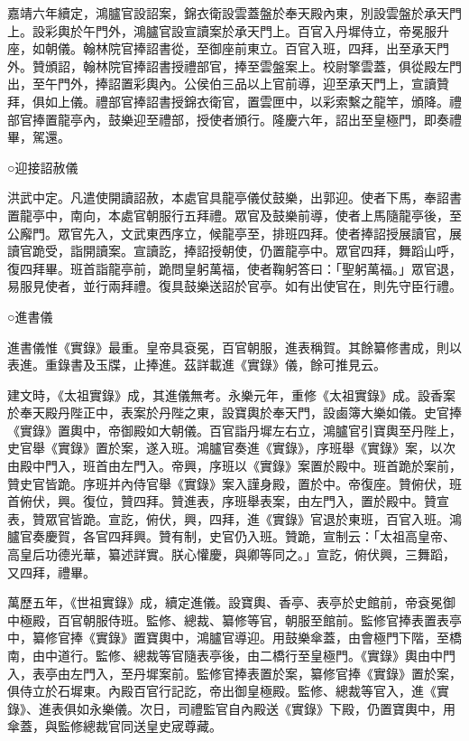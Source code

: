 嘉靖六年續定，鴻臚官設詔案，錦衣衛設雲蓋盤於奉天殿內東，別設雲盤於承天門上。設彩輿於午門外，鴻臚官設宣讀案於承天門上。百官入丹墀侍立，帝冕服升座，如朝儀。翰林院官捧詔書從，至御座前東立。百官入班，四拜，出至承天門外。贊頒詔，翰林院官捧詔書授禮部官，捧至雲盤案上。校尉擎雲蓋，俱從殿左門出，至午門外，捧詔置彩輿內。公侯伯三品以上官前導，迎至承天門上，宣讀贊拜，俱如上儀。禮部官捧詔書授錦衣衛官，置雲匣中，以彩索繫之龍竿，頒降。禮部官捧置龍亭內，鼓樂迎至禮部，授使者頒行。隆慶六年，詔出至皇極門，即奏禮畢，駕還。

○迎接詔赦儀

洪武中定。凡遣使開讀詔赦，本處官具龍亭儀仗鼓樂，出郭迎。使者下馬，奉詔書置龍亭中，南向，本處官朝服行五拜禮。眾官及鼓樂前導，使者上馬隨龍亭後，至公廨門。眾官先入，文武東西序立，候龍亭至，排班四拜。使者捧詔授展讀官，展讀官跪受，詣開讀案。宣讀訖，捧詔授朝使，仍置龍亭中。眾官四拜，舞蹈山呼，復四拜畢。班首詣龍亭前，跪問皇躬萬福，使者鞠躬答曰：「聖躬萬福。」眾官退，易服見使者，並行兩拜禮。復具鼓樂送詔於官亭。如有出使官在，則先守臣行禮。

○進書儀

進書儀惟《實錄》最重。皇帝具袞冕，百官朝服，進表稱賀。其餘纂修書成，則以表進。重錄書及玉牒，止捧進。茲詳載進《實錄》儀，餘可推見云。

建文時，《太祖實錄》成，其進儀無考。永樂元年，重修《太祖實錄》成。設香案於奉天殿丹陛正中，表案於丹陛之東，設寶輿於奉天門，設鹵簿大樂如儀。史官捧《實錄》置輿中，帝御殿如大朝儀。百官詣丹墀左右立，鴻臚官引寶輿至丹陛上，史官舉《實錄》置於案，遂入班。鴻臚官奏進《實錄》，序班舉《實錄》案，以次由殿中門入，班首由左門入。帝興，序班以《實錄》案置於殿中。班首跪於案前，贊史官皆跪。序班并內侍官舉《實錄》案入謹身殿，置於中。帝復座。贊俯伏，班首俯伏，興。復位，贊四拜。贊進表，序班舉表案，由左門入，置於殿中。贊宣表，贊眾官皆跪。宣訖，俯伏，興，四拜，進《實錄》官退於東班，百官入班。鴻臚官奏慶賀，各官四拜興。贊有制，史官仍入班。贊跪，宣制云：「太祖高皇帝、高皇后功德光華，纂述詳實。朕心懽慶，與卿等同之。」宣訖，俯伏興，三舞蹈，又四拜，禮畢。

萬歷五年，《世祖實錄》成，續定進儀。設寶輿、香亭、表亭於史館前，帝袞冕御中極殿，百官朝服侍班。監修、總裁、纂修等官，朝服至館前。監修官捧表置表亭中，纂修官捧《實錄》置寶輿中，鴻臚官導迎。用鼓樂傘蓋，由會極門下階，至橋南，由中道行。監修、總裁等官隨表亭後，由二橋行至皇極門。《實錄》輿由中門入，表亭由左門入，至丹墀案前。監修官捧表置於案，纂修官捧《實錄》置於案，俱侍立於石墀東。內殿百官行記訖，帝出御皇極殿。監修、總裁等官入，進《實錄》、進表俱如永樂儀。次日，司禮監官自內殿送《實錄》下殿，仍置寶輿中，用傘蓋，與監修總裁官同送皇史宬尊藏。

